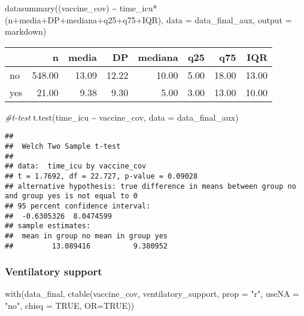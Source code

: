 \documentclass[
]{article}
\newenvironment{Shaded}{\begin{snugshade}}{\end{snugshade}}
\newcommand{\AttributeTok}[1]{\textcolor[rgb]{0.77,0.63,0.00}{#1}}
\newcommand{\CommentTok}[1]{\textcolor[rgb]{0.56,0.35,0.01}{\textit{#1}}}
\newcommand{\ConstantTok}[1]{\textcolor[rgb]{0.00,0.00,0.00}{#1}}
\newcommand{\FunctionTok}[1]{\textcolor[rgb]{0.00,0.00,0.00}{#1}}
\newcommand{\NormalTok}[1]{#1}
\newcommand{\SpecialCharTok}[1]{\textcolor[rgb]{0.00,0.00,0.00}{#1}}
\newcommand{\StringTok}[1]{\textcolor[rgb]{0.31,0.60,0.02}{#1}}
\begin{document}
\begin{Shaded}
\begin{Highlighting}[]
\FunctionTok{datasummary}\NormalTok{((vaccine\_cov) }\SpecialCharTok{\textasciitilde{}}\NormalTok{ time\_icu}\SpecialCharTok{*}\NormalTok{(n}\SpecialCharTok{+}\NormalTok{media}\SpecialCharTok{+}\NormalTok{DP}\SpecialCharTok{+}\NormalTok{mediana}\SpecialCharTok{+}\NormalTok{q25}\SpecialCharTok{+}\NormalTok{q75}\SpecialCharTok{+}\NormalTok{IQR),}
            \AttributeTok{data =}\NormalTok{ data\_final\_aux, }\AttributeTok{output =} \StringTok{\textquotesingle{}markdown\textquotesingle{}}\NormalTok{)}
\end{Highlighting}
\end{Shaded}

\begin{longtable}[]{@{}lrrrrrrr@{}}
\toprule
& n & media & DP & mediana & q25 & q75 & IQR \\
\midrule
\endhead
no & 548.00 & 13.09 & 12.22 & 10.00 & 5.00 & 18.00 & 13.00 \\
yes & 21.00 & 9.38 & 9.30 & 5.00 & 3.00 & 13.00 & 10.00 \\
\bottomrule
\end{longtable}

\begin{Shaded}
\begin{Highlighting}[]
\CommentTok{\#t{-}test}
\FunctionTok{t.test}\NormalTok{(time\_icu }\SpecialCharTok{\textasciitilde{}}\NormalTok{ vaccine\_cov, }\AttributeTok{data =}\NormalTok{ data\_final\_aux)}
\end{Highlighting}
\end{Shaded}

\begin{verbatim}
## 
##  Welch Two Sample t-test
## 
## data:  time_icu by vaccine_cov
## t = 1.7692, df = 22.727, p-value = 0.09028
## alternative hypothesis: true difference in means between group no and group yes is not equal to 0
## 95 percent confidence interval:
##  -0.6305326  8.0474599
## sample estimates:
##  mean in group no mean in group yes 
##         13.089416          9.380952
\end{verbatim}

\hypertarget{ventilatory-support}{%
\subsubsection{Ventilatory support}\label{ventilatory-support}}

\begin{Shaded}
\begin{Highlighting}[]
\FunctionTok{with}\NormalTok{(data\_final, }\FunctionTok{ctable}\NormalTok{(vaccine\_cov, ventilatory\_support, }\AttributeTok{prop =} \StringTok{"r"}\NormalTok{, }\AttributeTok{useNA =} \StringTok{"no"}\NormalTok{, }\AttributeTok{chisq =} \ConstantTok{TRUE}\NormalTok{, }\AttributeTok{OR=}\ConstantTok{TRUE}\NormalTok{))}
\end{Highlighting}
\end{Shaded}
\end{document}
